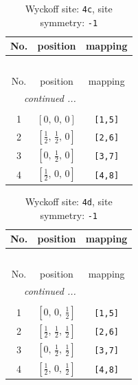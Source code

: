 \documentclass[fleqn,8pt]{jsarticle}
\begin{document}
\renewcommand{\arraystretch}{1.2}
\begin{longtable}{ccc}
\caption{Wyckoff site: {\tt 4c}, site symmetry: {\tt -1}}
 \\
 \hline \hline
No. & position & mapping \\ \hline \endfirsthead

\multicolumn{2}{l}{\tablename\ \thetable{}} \\
 \hline \hline
No. & position & mapping \\ \hline \endhead

 \hline \hline
\multicolumn{2}{r}{\footnotesize\it continued ...} \\ \endfoot

 \hline \hline
\multicolumn{2}{r}{} \\ \endlastfoot

1 & $\left[ 0,\, 0,\, 0 \right]$ & {\tt [1,5]} \\ \hline
2 & $\left[ \frac{1}{2},\, \frac{1}{2},\, 0 \right]$ & {\tt [2,6]} \\ \hline
3 & $\left[ 0,\, \frac{1}{2},\, 0 \right]$ & {\tt [3,7]} \\ \hline
4 & $\left[ \frac{1}{2},\, 0,\, 0 \right]$ & {\tt [4,8]} \\
\end{longtable}
\renewcommand{\arraystretch}{1.2}
\begin{longtable}{ccc}
\caption{Wyckoff site: {\tt 4d}, site symmetry: {\tt -1}}
 \\
 \hline \hline
No. & position & mapping \\ \hline \endfirsthead

\multicolumn{2}{l}{\tablename\ \thetable{}} \\
 \hline \hline
No. & position & mapping \\ \hline \endhead

 \hline \hline
\multicolumn{2}{r}{\footnotesize\it continued ...} \\ \endfoot

 \hline \hline
\multicolumn{2}{r}{} \\ \endlastfoot

1 & $\left[ 0,\, 0,\, \frac{1}{2} \right]$ & {\tt [1,5]} \\ \hline
2 & $\left[ \frac{1}{2},\, \frac{1}{2},\, \frac{1}{2} \right]$ & {\tt [2,6]} \\ \hline
3 & $\left[ 0,\, \frac{1}{2},\, \frac{1}{2} \right]$ & {\tt [3,7]} \\ \hline
4 & $\left[ \frac{1}{2},\, 0,\, \frac{1}{2} \right]$ & {\tt [4,8]} \\
\end{longtable}
\end{document}
